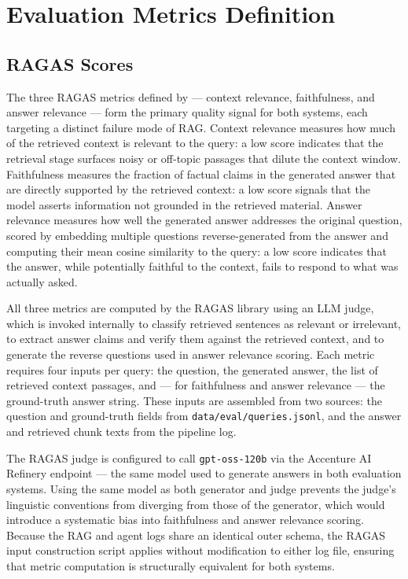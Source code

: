 \section{Evaluation Metrics Definition}
\label{sec:metrics}

\subsection{RAGAS Scores}

The three RAGAS metrics defined by  — context relevance, faithfulness, and answer relevance — form the primary quality signal for both systems, each targeting a distinct failure mode of RAG. Context relevance measures how much of the retrieved context is relevant to the query: a low score indicates that the retrieval stage surfaces noisy or off-topic passages that dilute the context window. Faithfulness measures the fraction of factual claims in the generated answer that are directly supported by the retrieved context: a low score signals that the model asserts information not grounded in the retrieved material. Answer relevance measures how well the generated answer addresses the original question, scored by embedding multiple questions reverse-generated from the answer and computing their mean cosine similarity to the query: a low score indicates that the answer, while potentially faithful to the context, fails to respond to what was actually asked.

All three metrics are computed by the RAGAS library using an LLM judge, which is invoked internally to classify retrieved sentences as relevant or irrelevant, to extract answer claims and verify them against the retrieved context, and to generate the reverse questions used in answer relevance scoring. Each metric requires four inputs per query: the question, the generated answer, the list of retrieved context passages, and — for faithfulness and answer relevance — the ground-truth answer string. These inputs are assembled from two sources: the question and ground-truth fields from \texttt{data/eval/queries.jsonl}, and the answer and retrieved chunk texts from the pipeline log.

The RAGAS judge is configured to call \texttt{gpt-oss-120b} via the Accenture AI Refinery endpoint — the same model used to generate answers in both evaluation systems. Using the same model as both generator and judge prevents the judge's linguistic conventions from diverging from those of the generator, which would introduce a systematic bias into faithfulness and answer relevance scoring. Because the RAG and agent logs share an identical outer schema, the RAGAS input construction script applies without modification to either log file, ensuring that metric computation is structurally equivalent for both systems.

